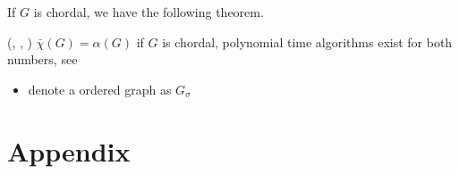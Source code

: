 If \(G\) is chordal, we have the following theorem.

\begin{theorem}
      (\cite{gavril_algorithms_1972}, \cite{schrijver_combinatorial_2003}, \cite{vandenberghe_chordal_2015})
      \(\bar \chi (G) = \alpha(G)\) if \(G\) is chordal,
      polynomial time algorithms exist for both numbers, see \cite{gavril_algorithms_1972}
\end{theorem}


\begin{itemize}
      \tightlist
      \item
            denote a ordered graph as \(G_\sigma\)
\end{itemize}





\section*{Appendix}\label{sec:appendix}

